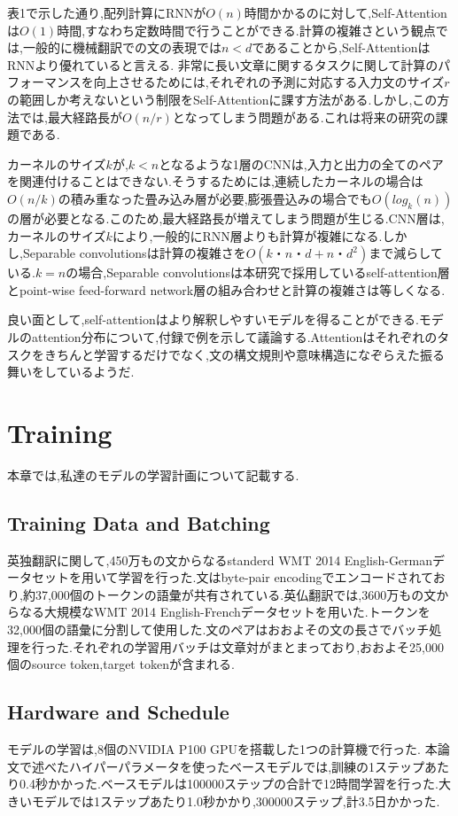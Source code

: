 \documentclass{jarticle}     %
\begin{document}
表1で示した通り,配列計算にRNNが$O(n)$時間かかるのに対して,Self-Attentionは$O(1)$時間,すなわち定数時間で行うことができる.計算の複雑さという観点では,一般的に機械翻訳での文の表現では$n<d$であることから,Self-AttentionはRNNより優れていると言える.
非常に長い文章に関するタスクに関して計算のパフォーマンスを向上させるためには,それぞれの予測に対応する入力文のサイズ$r$の範囲しか考えないという制限をSelf-Attentionに課す方法がある.しかし,この方法では,最大経路長が$O(n/r)$となってしまう問題がある.これは将来の研究の課題である.
\par
カーネルのサイズ$k$が,$k<n$となるような1層のCNNは,入力と出力の全てのペアを関連付けることはできない.そうするためには,連続したカーネルの場合は$O(n/k)$の積み重なった畳み込み層が必要,膨張畳込みの場合でも$O(log_k(n))$の層が必要となる.このため,最大経路長が増えてしまう問題が生じる.CNN層は,カーネルのサイズ$k$により,一般的にRNN層よりも計算が複雑になる.しかし,Separable convolutionsは計算の複雑さを$O(k・n・d + n・d^2)$まで減らしている.$k=n$の場合,Separable convolutionsは本研究で採用しているself-attention層とpoint-wise feed-forward network層の組み合わせと計算の複雑さは等しくなる.
\par
良い面として,self-attentionはより解釈しやすいモデルを得ることができる.モデルのattention分布について,付録で例を示して議論する.Attentionはそれぞれのタスクをきちんと学習するだけでなく,文の構文規則や意味構造になぞらえた振る舞いをしているようだ.

\section{Training}
本章では,私達のモデルの学習計画について記載する.

\subsection{Training Data and Batching}
英独翻訳に関して,450万もの文からなるstanderd WMT 2014 English-Germanデータセットを用いて学習を行った.文はbyte-pair encodingでエンコードされており,約37,000個のトークンの語彙が共有されている.英仏翻訳では,3600万もの文からなる大規模なWMT 2014 English-Frenchデータセットを用いた.トークンを32,000個の語彙に分割して使用した.文のペアはおおよその文の長さでバッチ処理を行った.それぞれの学習用バッチは文章対がまとまっており,おおよそ25,000個のsource token,target tokenが含まれる.

\subsection{Hardware and Schedule}
モデルの学習は,8個のNVIDIA P100 GPUを搭載した1つの計算機で行った.
本論文で述べたハイパーパラメータを使ったベースモデルでは,訓練の1ステップあたり0.4秒かかった.ベースモデルは100000ステップの合計で12時間学習を行った.大きいモデルでは1ステップあたり1.0秒かかり,300000ステップ,計3.5日かかった.
\end{document}
